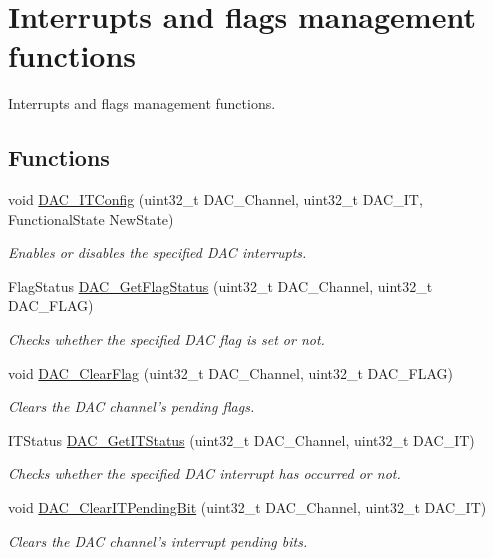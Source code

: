 \hypertarget{group___d_a_c___group3}{\section{Interrupts and flags management functions}
\label{group___d_a_c___group3}
}


Interrupts and flags management functions.  


\subsection*{Functions}
\begin{DoxyCompactItemize}
\item 
void \hyperlink{group___d_a_c___group3_ga12d7495b30eae40c2570118cabbda1c3}{D\-A\-C\-\_\-\-I\-T\-Config} (uint32\-\_\-t D\-A\-C\-\_\-\-Channel, uint32\-\_\-t D\-A\-C\-\_\-\-I\-T, Functional\-State New\-State)
\begin{DoxyCompactList}\small\item\em Enables or disables the specified D\-A\-C interrupts. \end{DoxyCompactList}\item 
Flag\-Status \hyperlink{group___d_a_c___group3_ga9ee60b78f0ccd23bfbe54bce2a2f909b}{D\-A\-C\-\_\-\-Get\-Flag\-Status} (uint32\-\_\-t D\-A\-C\-\_\-\-Channel, uint32\-\_\-t D\-A\-C\-\_\-\-F\-L\-A\-G)
\begin{DoxyCompactList}\small\item\em Checks whether the specified D\-A\-C flag is set or not. \end{DoxyCompactList}\item 
void \hyperlink{group___d_a_c___group3_ga49543c52786d70d6b6311f3fee856d37}{D\-A\-C\-\_\-\-Clear\-Flag} (uint32\-\_\-t D\-A\-C\-\_\-\-Channel, uint32\-\_\-t D\-A\-C\-\_\-\-F\-L\-A\-G)
\begin{DoxyCompactList}\small\item\em Clears the D\-A\-C channel's pending flags. \end{DoxyCompactList}\item 
I\-T\-Status \hyperlink{group___d_a_c___group3_ga541aac3b50db3a8a806ec5ef30679aca}{D\-A\-C\-\_\-\-Get\-I\-T\-Status} (uint32\-\_\-t D\-A\-C\-\_\-\-Channel, uint32\-\_\-t D\-A\-C\-\_\-\-I\-T)
\begin{DoxyCompactList}\small\item\em Checks whether the specified D\-A\-C interrupt has occurred or not. \end{DoxyCompactList}\item 
void \hyperlink{group___d_a_c___group3_ga12d90e69a2642997136b23224d180641}{D\-A\-C\-\_\-\-Clear\-I\-T\-Pending\-Bit} (uint32\-\_\-t D\-A\-C\-\_\-\-Channel, uint32\-\_\-t D\-A\-C\-\_\-\-I\-T)
\begin{DoxyCompactList}\small\item\em Clears the D\-A\-C channel's interrupt pending bits. \end{DoxyCompactList}\end{DoxyCompactItemize}


